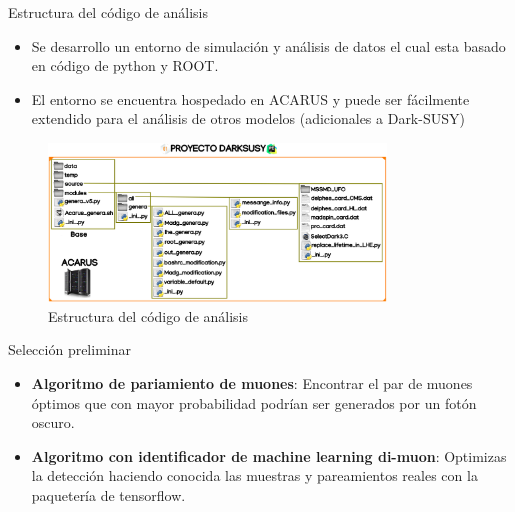 \begin{frame}{Estructura del c\'odigo de an\'alisis}

\begin{itemize}
    \item Se desarrollo un entorno de simulaci\'on y an\'alisis de datos el cual esta basado en c\'odigo de python y ROOT. 
    \item El entorno se encuentra hospedado en ACARUS y puede ser f\'acilmente extendido para el an\'alisis de otros modelos (adicionales a Dark-SUSY)
\end{itemize}
    
\begin{figure}[h]
\centering
\includegraphics[width=0.8\textwidth]{Imag/proyecto_darksusy.png}
\caption{Estructura del c\'odigo de an\'alisis}
\end{figure}

\end{frame}



\begin{frame}{Selecci\'on preliminar}

\begin{itemize}
\item \textbf{Algoritmo de pariamiento de muones}: Encontrar el par de muones \'optimos que con mayor probabilidad podr\'ian ser generados por un fot\'on oscuro.

\item \textbf{Algoritmo con identificador de machine learning di-muon}: Optimizas la detecci\'on haciendo conocida las muestras y pareamientos reales con la paqueter\'ia de tensorflow.

\end{itemize}
    
\end{frame}


